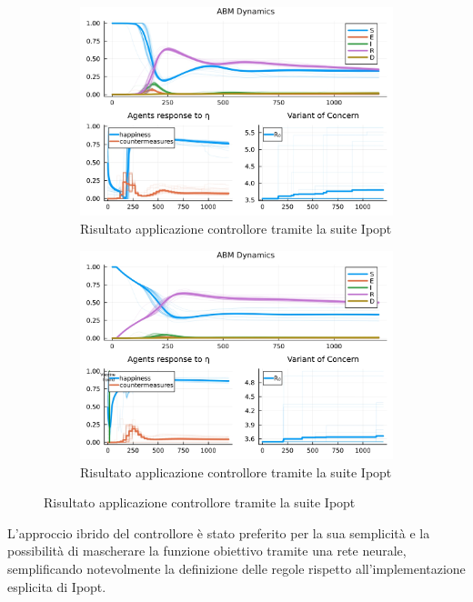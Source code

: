\begin{figure}[H]
	\centering
	\begin{subfigure}[b]{\textwidth}
		\centering
		\includegraphics[width=\textwidth]{img/SocialNetworkABM_IPOPT_CONTROL.jpg}
		\caption{Risultato applicazione controllore tramite la suite Ipopt}
		\label{fig:ipopt_res1}
	\end{subfigure}
	\hfill
	\begin{subfigure}[b]{\textwidth}
		\centering
		\includegraphics[width=\textwidth]{img/SocialNetworkABM_IPOPT_ALL.jpg}
		\caption{Risultato applicazione controllore tramite la suite Ipopt}
		\label{fig:ipopt_res2}
	\end{subfigure}
\end{figure}

L'approccio ibrido del controllore è stato preferito per la sua 
semplicità e la possibilità di mascherare la funzione obiettivo 
tramite una rete neurale, semplificando notevolmente la definizione 
delle regole rispetto all'implementazione esplicita di Ipopt.